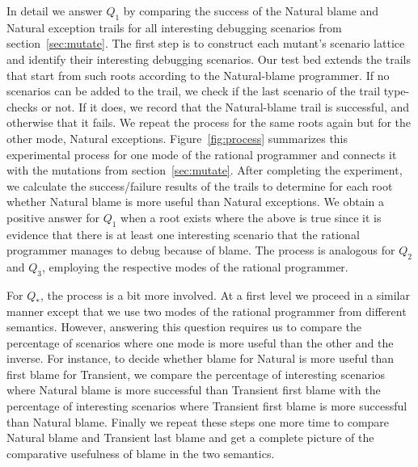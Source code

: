 
In detail we answer $Q_1$  by comparing the success of the 
Natural blame and Natural exception trails for all interesting 
debugging scenarios from section~\ref{sec:mutate}.
  The first step is to construct each
mutant's scenario lattice and identify their interesting debugging
scenarios.
Our test
bed extends the trails that start from such roots according to the Natural-blame programmer.  If no scenarios
can be added to the trail, we check if
the last scenario of the trail type-checks or not. If it does, we record that the Natural-blame
trail is successful, and otherwise that it fails. We repeat the process for the
same roots again but for the other mode, Natural exceptions.
 Figure~\ref{fig:process}
summarizes this
experimental process for one mode of the rational programmer and connects
it with the mutations from section~\ref{sec:mutate}.
After completing the experiment, we calculate the
success/failure results of the trails to determine for each root whether Natural blame
is more useful than Natural exceptions. We
obtain a positive answer for
$Q_1$ when a root exists where the above is true since it is evidence that
there is at least one interesting scenario that the rational programmer
manages to debug because of blame. 
The process is analogous for $Q_2$ and $Q_3$, employing the respective
modes of the rational programmer.

For $Q_*$, the process is a bit more
involved. At a first level we proceed in a similar
manner except that we use two modes 
of the rational programmer from different semantics.
However, answering this question requires us to compare the percentage of scenarios
where one mode is more useful than the other and the inverse.
For instance, to
decide whether blame for Natural is more useful than first blame for Transient, 
we compare the percentage of interesting scenarios where 
Natural blame is more successful than Transient first blame 
with the percentage of interesting scenarios where Transient first blame 
is more successful than Natural blame. 
Finally we repeat these steps one more time to compare Natural blame and Transient last blame
and get a complete picture of the comparative usefulness of blame
in the two semantics.

